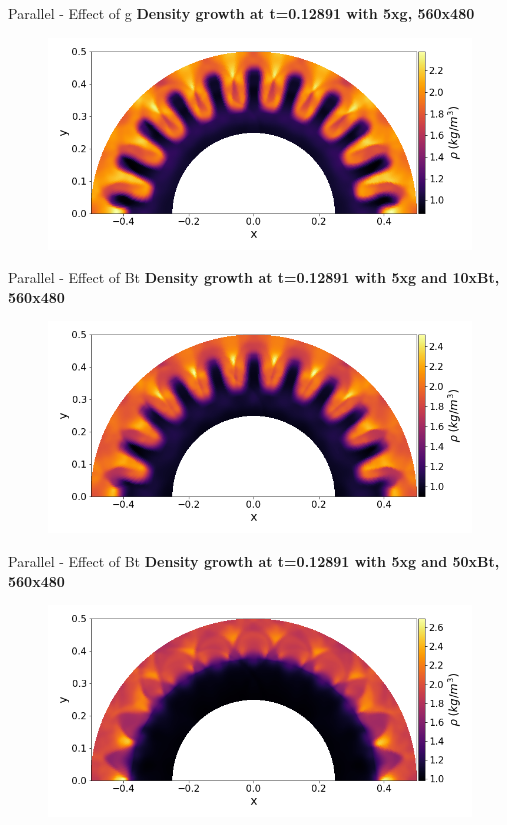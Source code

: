 \begin{frame}[t]{Parallel - Effect of g}
  \textbf{Density growth at t=0.12891 with 5xg, 560x480}
 \begin{figure}[!htbp]
   \includegraphics[width=0.85\linewidth]{fig/560x480cpu}
   \centering
 \end{figure}
\end{frame}

\begin{frame}[t]{Parallel - Effect of Bt}
  \textbf{Density growth at t=0.12891 with 5xg and 10xBt, 560x480}
 \begin{figure}[!htbp]
   \includegraphics[width=0.85\linewidth]{fig/560x480cpuBx}
   \centering
 \end{figure}
\end{frame}

\begin{frame}[t]{Parallel - Effect of Bt}
  \textbf{Density growth at t=0.12891 with 5xg and 50xBt, 560x480}
 \begin{figure}[!htbp]
   \includegraphics[width=0.85\linewidth]{fig/560x480cpuBx5}
   \centering
 \end{figure}
\end{frame}

